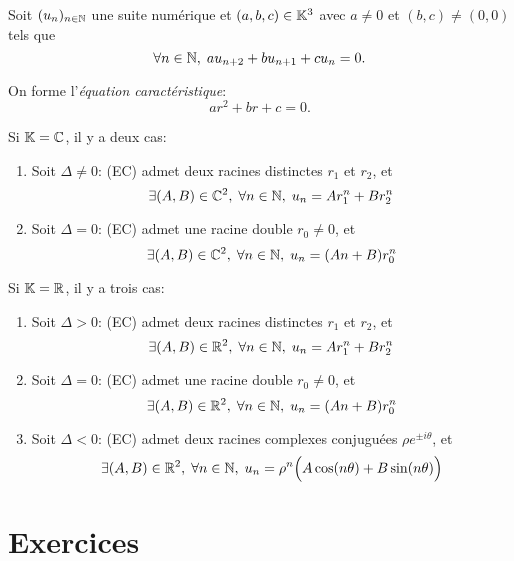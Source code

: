 \documentclass{yann}
\newcommand\I{i}
\newcommand\U{(u_n)_{n\in\N}}
\begin{document}

Soit $\U$ une suite numérique et $(a,b,c)\in\mathbb{K}^3$ avec
$a\neq0$ et $(b,c)\neq(0,0)$
tels que \[ \forall n\in\mathbb{N},\; au_{n+2} + bu_{n+1} + c u_n = 0. \]

On forme l'\emph{équation caractéristique}:
\[ ar^2 + br + c = 0. \tag{EC} \]

Si \emph{$\mathbb{K}=\mathbb{C}$}, il y a deux cas:
\begin{enumerate}
\item
Soit $\Delta\neq0$:
  (EC) admet deux racines distinctes $r_1$ et $r_2$, et
  \[ \exists(A,B)\in\mathbb{C}^2,\;\forall n\in\mathbb{N},\; u_n = A r_1^n + B r_2^n \]
\item
Soit $\Delta= 0$:
  (EC) admet une racine double $r_0\neq0$, et
  \[ \exists(A,B)\in\mathbb{C}^2,\;\forall n\in\mathbb{N},\; u_n = (An + B) r_0^n \]
\end{enumerate}

Si \emph{$\mathbb{K}=\mathbb{R}$}, il y a trois cas:
\begin{enumerate}
\item
Soit $\Delta> 0$:
  (EC) admet deux racines distinctes $r_1$ et $r_2$, et
  \[ \exists(A,B)\in\mathbb{R}^2,\;\forall n\in\mathbb{N},\; u_n = A r_1^n + B r_2^n \]
\item
Soit $\Delta= 0$:
  (EC) admet une racine double $r_0\neq0$, et
  \[ \exists(A,B)\in\mathbb{R}^2,\;\forall n\in\mathbb{N},\; u_n = (An + B) r_0^n \]
\item
Soit $\Delta< 0$:
  (EC) admet deux racines complexes conjuguées $\rho e^{\pm\I\theta}$, et
  \[ \exists(A,B)\in\mathbb{R}^2,\;\forall n\in\mathbb{N},\; u_n =\rho^n \Big( A \cos(n\theta) + B \sin(n\theta) \Big) \]
\end{enumerate}

\section{Exercices}

\Exercice
\end{document}
